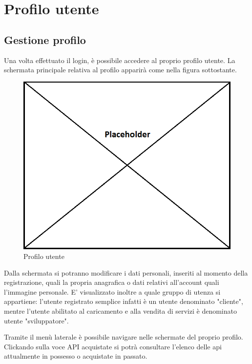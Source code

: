 \newpage
\section{Profilo utente}

\subsection{Gestione profilo}

Una volta effettuato il login, è possibile accedere al proprio profilo utente. La schermata principale relativa al profilo apparirà come nella figura sottostante.

\label{Profilo utente}
\begin{figure}[H]
	\centering
	\includegraphics[scale=0.45]{img/placeholder.png}
	\caption{Profilo utente}
\end{figure}

Dalla schermata si potranno modificare i dati personali, inseriti al momento della registrazione, quali la propria anagrafica o dati relativi all'account quali l'immagine personale. E' visualizzato inoltre a quale gruppo di utenza si appartiene: l'utente registrato semplice infatti è un utente denominato "cliente", mentre l'utente abilitato al caricamento e alla vendita di servizi è denominato utente "sviluppatore".

Tramite il menù laterale è possibile navigare nelle schermate del proprio profilo. Clickando sulla voce API acquistate si potrà consultare l'elenco delle api attualmente in possesso o acquistate in passato.

